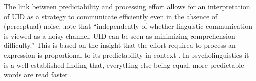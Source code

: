 The link between predictability and processing effort allows for an interpretation of UID as a strategy to communicate efficiently even in the absence of (perceptual) noise. \citet[850]{levy.jaeger2007} note that ``independently of whether linguistic communication is viewed as a noisy channel, UID can be seen as minimizing comprehension difficulty.'' This is based on the insight that the effort required to process an expression is proportional to its predictability in context \citep{hale2001, hale2016, levy2005, levy2008}. In psycholinguistics it is a well-established finding that, everything else being equal, more predictable words are read faster \citep[see e.g.][]{ehrlich.rayner1981, mcdonald.shillcock2003, demberg.keller2008, smith.levy2013}.

